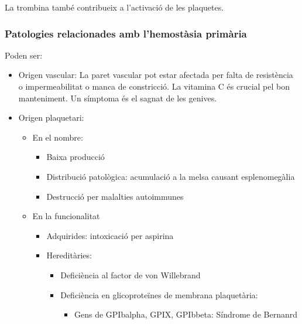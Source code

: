 La trombina també contribueix a l'activació de les plaquetes.

\subsubsection{Patologies relacionades amb l'hemostàsia primària}
Poden ser:
\begin{itemize}
\item Origen vascular: La paret vascular pot estar afectada per falta
  de resistència o impermeabilitat o manca de constricció. La vitamina
  C és crucial pel bon manteniment. Un símptoma és el sagnat de les
  genives.

\item Origen plaquetari:
  \begin{itemize}
  \item En el nombre:
    \begin{itemize}
    \item Baixa producció
    \item Distribució patològica: acumulació a la melsa causant
      esplenomegàlia
    \item Destrucció per malalties autoimmunes
    \end{itemize}
  \item En la funcionalitat
    \begin{itemize}
    \item Adquirides: intoxicació per aspirina
    \item Hereditàries:
      \begin{itemize}
      \item Deficiència al factor de von Willebrand
      \item Deficiència en glicoproteïnes de membrana plaquetària:
        \begin{itemize}
        \item Gens de GPIbalpha, GPIX, GPIbbeta: Síndrome de Bernanrd
        \end{itemize}
      \end{itemize}
    \end{itemize}
  \end{itemize}
\end{itemize}


